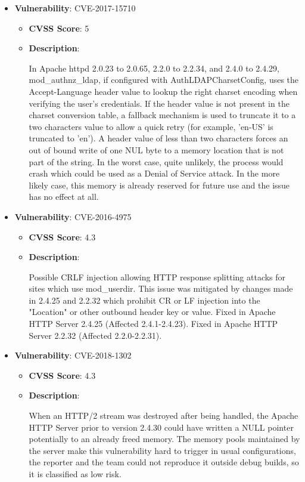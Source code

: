 \documentclass{article}
\begin{document}
\begin{itemize}
        \item \textbf{Vulnerability}: CVE-2017-15710
        \begin{itemize}
            \item \textbf{CVSS Score}:  5 
            \item \textbf{Description}:
            \parbox[t]{0.9\linewidth}{
                \ttfamily In Apache httpd 2.0.23 to 2.0.65, 2.2.0 to 2.2.34, and 2.4.0 to 2.4.29, mod\_authnz\_ldap, if configured with AuthLDAPCharsetConfig, uses the Accept-Language header value to lookup the right charset encoding when verifying the user's credentials. If the header value is not present in the charset conversion table, a fallback mechanism is used to truncate it to a two characters value to allow a quick retry (for example, 'en-US' is truncated to 'en'). A header value of less than two characters forces an out of bound write of one NUL byte to a memory location that is not part of the string. In the worst case, quite unlikely, the process would crash which could be used as a Denial of Service attack. In the more likely case, this memory is already reserved for future use and the issue has no effect at all.
            }
        \end{itemize}
    
        \item \textbf{Vulnerability}: CVE-2016-4975
        \begin{itemize}
            \item \textbf{CVSS Score}:  4.3 
            \item \textbf{Description}:
            \parbox[t]{0.9\linewidth}{
                \ttfamily Possible CRLF injection allowing HTTP response splitting attacks for sites which use mod\_userdir. This issue was mitigated by changes made in 2.4.25 and 2.2.32 which prohibit CR or LF injection into the "Location" or other outbound header key or value. Fixed in Apache HTTP Server 2.4.25 (Affected 2.4.1-2.4.23). Fixed in Apache HTTP Server 2.2.32 (Affected 2.2.0-2.2.31).
            }
        \end{itemize}
    
        \item \textbf{Vulnerability}: CVE-2018-1302
        \begin{itemize}
            \item \textbf{CVSS Score}:  4.3 
            \item \textbf{Description}:
            \parbox[t]{0.9\linewidth}{
                \ttfamily When an HTTP/2 stream was destroyed after being handled, the Apache HTTP Server prior to version 2.4.30 could have written a NULL pointer potentially to an already freed memory. The memory pools maintained by the server make this vulnerability hard to trigger in usual configurations, the reporter and the team could not reproduce it outside debug builds, so it is classified as low risk.
            }
        \end{itemize}
    

\end{itemize}
\end{document}
